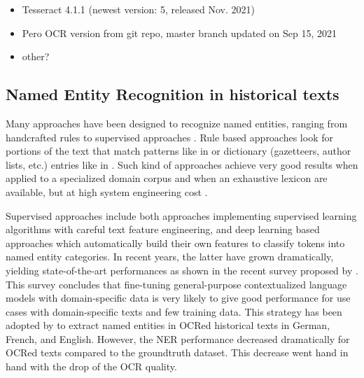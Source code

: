 \begin{itemize}
    \item Tesseract 4.1.1 (newest version: 5, released Nov. 2021)
    \item Pero OCR version from git repo, master branch updated on Sep 15, 2021 %
    \item other?  %
\end{itemize}




\subsection{Named Entity Recognition in historical texts}
\label{subsection:stoa-ner-on-historical-texts}

Many approaches have been designed to recognize named entities, ranging from handcrafted rules to supervised approaches \cite{nadeau2007}.
Rule based approaches look for portions of the text that match patterns like in \cite{bell2020automated,nouvel2011} or dictionary (gazetteers, author lists, etc.) entries like in \cite{mansouri2008,maurel2011}.
Such kind of approaches achieve very good results when applied to a specialized domain corpus and when an exhaustive lexicon are available, but at high system engineering cost \cite{nadeau2007}. 

Supervised approaches include both approaches implementing supervised learning algorithms with careful text feature engineering, and deep learning based approaches which automatically build their own features to classify tokens into named entity categories.
In recent years, the latter have grown dramatically, yielding state-of-the-art performances as shown in the recent survey proposed by \cite{li2020}. This survey concludes that fine-tuning general-purpose contextualized language models with domain-specific data is very likely to give good performance for use cases with domain-specific texts and few training data. This strategy has been adopted by \cite{Labusch2020NamedED} to extract named entities in OCRed historical texts in German, French, and English. However, the NER performance decreased dramatically for OCRed texts compared to the groundtruth dataset. This decrease went hand in hand with the drop of the OCR quality.

